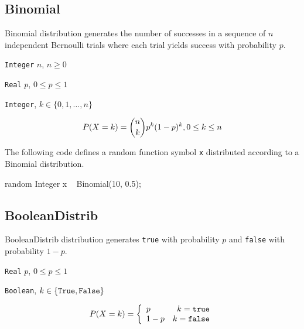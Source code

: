 \subsection{Binomial}
Binomial distribution generates the number of successes in a sequence of $n$ independent Bernoulli trials where each trial yields success with probability $p$.

\begin{itemize*}
\item[] \verb|Integer| $n$, $n \geq 0$
\item[] \verb|Real| $p$, $0 \leq p \leq 1$
\end{itemize*}

\begin{itemize*}
\item[] \verb|Integer|, $k \in \{0, 1, \ldots, n\} $
\end{itemize*}

\[
	P(X = k) = \binom{n}{k}p^{k}(1-p)^{k} , 0 \leq k \leq n \\
\]

The following code defines a random function symbol \verb|x| distributed according to a Binomial distribution.
\begin{blogcode}
random Integer x ~ Binomial(10, 0.5);
\end{blogcode}

\subsection{BooleanDistrib} \label{boolean-distribution-section}
BooleanDistrib distribution generates \verb|true| with probability $p$ and \verb|false| with probability $1-p$.

\begin{itemize*}
\item[] \verb|Real|
 $p$, $0 \leq p \leq 1$
\end{itemize*}

\begin{itemize*}
\item[] \verb|Boolean|, $k \in \{\verb|True|, \verb|False|\}$
\end{itemize*}

\[
	P(X = k) = \left\{
	  \begin{array}{lr}
	    p & k = \verb|true| \\
	    1 - p & k = \verb|false|
	  \end{array}
	\right.
\]

